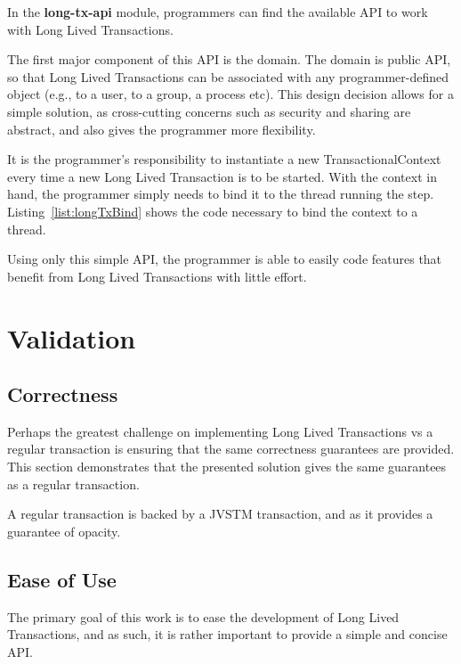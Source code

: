 In the {\bf long-tx-api} module, programmers can find the available
API to work with Long Lived Transactions.

The first major component of this API is the domain. The domain is
public API, so that Long Lived Transactions can be associated with any
programmer-defined object (e.g., to a user, to a group, a process
etc). This design decision allows for a simple solution, as
cross-cutting concerns such as security and sharing are abstract, and
also gives the programmer more flexibility.

It is the programmer's responsibility to instantiate a new
TransactionalContext every time a new Long Lived Transaction is to be
started. With the context in hand, the programmer simply needs to bind
it to the thread running the step. Listing~\ref{list:longTxBind} shows
the code necessary to bind the context to a thread.

Using only this simple API, the programmer is able to easily code
features that benefit from Long Lived Transactions with little effort.

\section{Validation}
\label{sec:validation}


\subsection{Correctness}

Perhaps the greatest challenge on implementing Long Lived Transactions
vs a regular transaction is ensuring that the same correctness
guarantees are provided. This section demonstrates that the presented
solution gives the same guarantees as a regular transaction.

A regular transaction is backed by a JVSTM transaction, and as it
provides a guarantee of opacity. 

\subsection{Ease of Use}

The primary goal of this work is to ease the development of Long Lived
Transactions, and as such, it is rather important to provide a simple
and concise API.